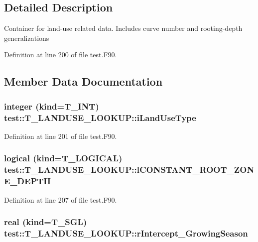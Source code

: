 \subsection{Detailed Description}
Container for land-\/use related data. Includes curve number and rooting-\/depth generalizations 

Definition at line 200 of file test.F90.



\subsection{Member Data Documentation}
\hypertarget{typetest_1_1_t___l_a_n_d_u_s_e___l_o_o_k_u_p_a993f4c54aa858ef686236d68c85a640e}{
\subsubsection[{iLandUseType}]{\setlength{\rightskip}{0pt plus 5cm}integer (kind={\bf T\_\-INT}) {\bf test::T\_\-LANDUSE\_\-LOOKUP::iLandUseType}}}
\label{typetest_1_1_t___l_a_n_d_u_s_e___l_o_o_k_u_p_a993f4c54aa858ef686236d68c85a640e}


Definition at line 201 of file test.F90.

\hypertarget{typetest_1_1_t___l_a_n_d_u_s_e___l_o_o_k_u_p_a7f54a9f4c95447a8362aa330edaeeee6}{
\subsubsection[{lCONSTANT\_\-ROOT\_\-ZONE\_\-DEPTH}]{\setlength{\rightskip}{0pt plus 5cm}logical (kind={\bf T\_\-LOGICAL}) {\bf test::T\_\-LANDUSE\_\-LOOKUP::lCONSTANT\_\-ROOT\_\-ZONE\_\-DEPTH}}}
\label{typetest_1_1_t___l_a_n_d_u_s_e___l_o_o_k_u_p_a7f54a9f4c95447a8362aa330edaeeee6}


Definition at line 207 of file test.F90.

\hypertarget{typetest_1_1_t___l_a_n_d_u_s_e___l_o_o_k_u_p_aa4321c2765690512bcc0cd6359a4f928}{
\subsubsection[{rIntercept\_\-GrowingSeason}]{\setlength{\rightskip}{0pt plus 5cm}real (kind={\bf T\_\-SGL}) {\bf test::T\_\-LANDUSE\_\-LOOKUP::rIntercept\_\-GrowingSeason}}}
\label{typetest_1_1_t___l_a_n_d_u_s_e___l_o_o_k_u_p_aa4321c2765690512bcc0cd6359a4f928}


